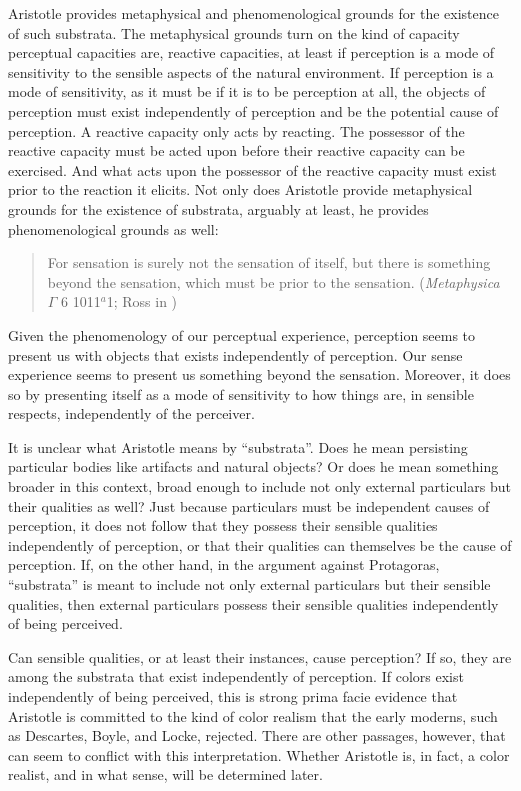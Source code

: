 Aristotle provides metaphysical and phenomenological grounds for the existence of such substrata. The metaphysical grounds turn on the kind of capacity perceptual capacities are, reactive capacities, at least if perception is a mode of sensitivity to the sensible aspects of the natural environment. If perception is a mode of sensitivity, as it must be if it is to be perception at all, the objects of perception must exist independently of perception and be the potential cause of perception. A reactive capacity only acts by reacting. The possessor of the reactive capacity must be acted upon before their reactive capacity can be exercised. And what acts upon the possessor of the reactive capacity must exist prior to the reaction it elicits. Not only does Aristotle provide metaphysical grounds for the existence of substrata, arguably at least, he provides phenomenological grounds as well: 
\begin{quote}
	For sensation is surely not the sensation of itself, but there is something beyond the sensation, which must be prior to the sensation. (\emph{Metaphysica} \( \Gamma \) 6 1011\( ^{a} \)1; Ross in \citealt[56]{Barnes:1984kx})
\end{quote}
Given the phenomenology of our perceptual experience, perception seems to present us with objects that exists independently of perception. Our sense experience seems to present us something beyond the sensation. Moreover, it does so by presenting itself as a mode of sensitivity to how things are, in sensible respects, independently of the perceiver.

It is unclear what Aristotle means by ``substrata''. Does he mean persisting particular bodies like artifacts and natural objects? Or does he mean something broader in this context, broad enough to include not only external particulars but their qualities as well? Just because particulars must be independent causes of perception, it does not follow that they possess their sensible qualities independently of perception, or that their qualities can themselves be the cause of perception. If, on the other hand, in the argument against Protagoras, ``substrata'' is meant to include not only external particulars but their sensible qualities, then external particulars possess their sensible qualities independently of being perceived. 

Can sensible qualities, or at least their instances, cause perception? If so, they are among the substrata that exist independently of perception. If colors exist independently of being perceived, this is strong prima facie evidence that Aristotle is committed to the kind of color realism that the early moderns, such as Descartes, Boyle, and Locke, rejected. There are other passages, however, that can seem to conflict with this interpretation. Whether Aristotle is, in fact, a color realist, and in what sense, will be determined later.


